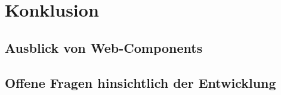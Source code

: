 \section{Konklusion}
\label{sec:5_Konklusion}

\subsection{Ausblick von Web-Components}
\label{sec:5_Ausblick}

\subsection{Offene Fragen hinsichtlich der Entwicklung}
\label{sec:5_Fragen}